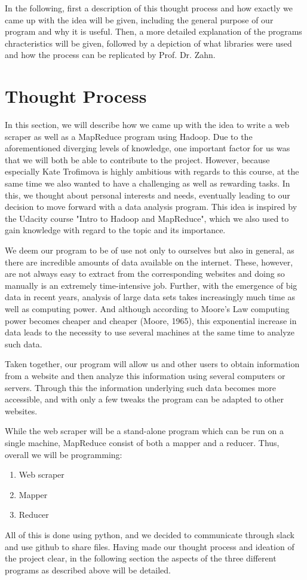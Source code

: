 \documentclass[a4paper, 12pt]{article}
\begin{document}
In the following, first a description of this thought process and how exactly we came up with the idea will be given, including the general purpose of our program and why it is useful. Then, a more detailed explanation of the programs chracteristics will be given, followed by a depiction of what libraries were used and how the process can be replicated by Prof. Dr. Zahn.
\cleardoublepage

\section{Thought Process}
In this section, we will describe how we came up with the idea to write a web scraper as well as a MapReduce program using Hadoop. Due to the aforementioned diverging levels of knowledge, one important factor for us was that we will both be able to contribute to the project. However, because especially Kate Trofimova is highly ambitious with regards to this course, at the same time we also wanted to have a challenging as well as rewarding tasks. In this, we thought about personal interests and needs, eventually leading to our decision to move forward with a data analysis program. This idea is inspired by the Udacity course "Intro to Hadoop and MapReduce", which we also used to gain knowledge with regard to the topic and its importance.

We deem our program to be of use not only to ourselves but also in general, as there are incredible amounts of data available on the internet. These, however, are not always easy to extract from the corresponding websites and doing so manually is an extremely time-intensive job. Further, with the emergence of big data in recent years, analysis of large data sets takes increasingly much time as well as computing power. And although according to Moore's Law computing power becomes cheaper and cheaper (Moore, 1965), this exponential increase in data leads to the necessity to use several machines at the same time to analyze such data. 

Taken together, our program will allow us and other users to obtain information from a website and then analyze this information using several computers or servers. Through this the information underlying such data becomes more accessible, and with only a few tweaks the program can be adapted to other websites.

While the web scraper will be a stand-alone program which can be run on a single machine, MapReduce consist of both a mapper and a reducer. Thus, overall we will be programming:
\begin{enumerate}
	\item Web scraper
	\item Mapper
	\item Reducer
\end{enumerate}
All of this is done using python, and we decided to communicate through slack and use github to share files. Having made our thought process and ideation of the project clear, in the following section the aspects of the three different programs as described above will be detailed.
\cleardoublepage
\end{document}
